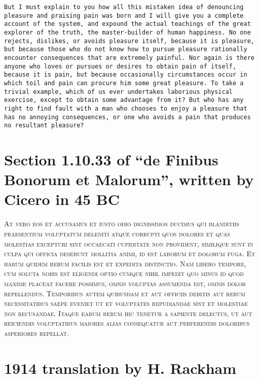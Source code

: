 \documentclass[a4paper, titlepage, 12pt]{amsart}
\begin{document}
\texttt{But I must explain to you how all this mistaken idea of denouncing pleasure and praising pain was born and I will give you a complete account of the system, and expound the actual teachings of the great explorer of the truth, the master-builder of human happiness. No one rejects, dislikes, or avoids pleasure itself, because it is pleasure, but because those who do not know how to pursue pleasure rationally encounter consequences that are extremely painful. Nor again is there anyone who loves or pursues or desires to obtain pain of itself, because it is pain, but because occasionally circumstances occur in which toil and pain can procure him some great pleasure. To take a trivial example, which of us ever undertakes laborious physical exercise, except to obtain some advantage from it? But who has any right to find fault with a man who chooses to enjoy a pleasure that has no annoying consequences, or one who avoids a pain that produces no resultant pleasure?}


\section{Section 1.10.33 of ``de Finibus Bonorum et Malorum'', written by Cicero in 45 BC}

\textsc{\huge At vero eos et accusamus et iusto odio dignissimos ducimus qui blanditiis praesentium voluptatum deleniti atque corrupti quos dolores et quas molestias excepturi sint occaecati cupiditate non provident, similique sunt in culpa qui officia deserunt mollitia animi, id est laborum et dolorum fuga. Et harum quidem rerum facilis est et expedita distinctio. Nam libero tempore, cum soluta nobis est eligendi optio cumque nihil impedit quo minus id quod maxime placeat facere possimus, omnis voluptas assumenda est, omnis dolor repellendus. Temporibus autem quibusdam et aut officiis debitis aut rerum necessitatibus saepe eveniet ut et voluptates repudiandae sint et molestiae non recusandae. Itaque earum rerum hic tenetur a sapiente delectus, ut aut reiciendis voluptatibus maiores alias consequatur aut perferendis doloribus asperiores repellat}.

\section{1914 translation by H. Rackham}
\end{document}
